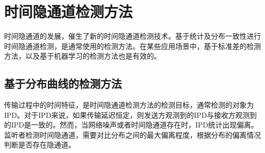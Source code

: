 \section{时间隐通道检测方法}
\label{chap:backinfo:detect}

时间隐通道的发展，催生了新的时间隐通道检测技术。基于统计及分布一致性进行时间隐通道检测，是通常使用的检测方法。在某些应用场景中，基于标准差的检测方法，以及基于机器学习的检测方法也是有效的。

\subsection{基于分布曲线的检测方法}
\label{chap:backinfo:detect:statistical}

传输过程中的时间特征，是时间隐通道检测方法的检测目标，通常检测的对象为IPD。对于IPD来说，如果传输延迟恒定，则发送方观测到的IPD与接收方观测到的IPD是一致的。然而，当网络噪声或者时间隐通道存在时，IPD统计出现偏离。监听者检测时间隐通道，需要对比分布之间的最大偏离程度，根据分布的偏离情况判断是否存在隐通道。



